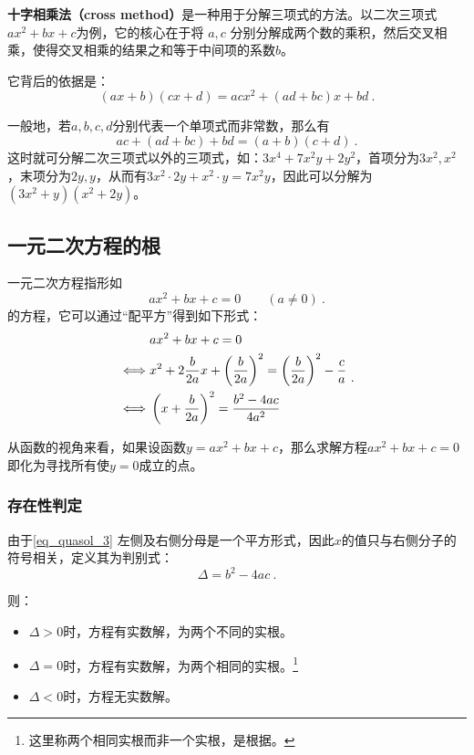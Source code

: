 \textbf{十字相乘法（cross method）}是一种用于分解三项式的方法。以二次三项式$ax^2 + bx + c$为例，它的核心在于将 $a,c$ 分别分解成两个数的乘积，然后交叉相乘，使得交叉相乘的结果之和等于中间项的系数$b$。

它背后的依据是：
\begin{equation}
(ax+b)(cx+d)=acx^2+(ad+bc)x+bd~.
\end{equation}

一般地，若$a,b,c,d$分别代表一个单项式而非常数，那么有
\begin{equation}
ac+(ad+bc)+bd=(a+b)(c+d)~.
\end{equation}
这时就可分解二次三项式以外的三项式，如：$3x^4+7x^2y+2y^2$，首项分为$3x^2,x^2$，末项分为$2y,y$，从而有$3x^2\cdot2y+x^2\cdot y=7x^2y$，因此可以分解为$(3x^2+y)(x^2+2y)$。

\subsection{一元二次方程的根}

一元二次方程指形如
\begin{equation}
ax^2+bx+c=0 \qquad (a\neq 0)~.
\end{equation}
的方程，它可以通过“配平方”得到如下形式：
\begin{equation}\label{eq_quasol_3}
\begin{split}
 & ax^2+bx+c = 0 \\ 
\iff&x^2+2{b\over 2a} x+\left({b\over 2a}\right)^2 = \left({b\over 2a}\right)^2-{c\over a} \\ 
\iff&\left(x+{b\over 2a}\right)^2 = {b^2-4ac\over 4a^2} \\ 
\end{split}~.
\end{equation}

从函数的视角来看，如果设函数$y=ax^2+bx+c$，那么求解方程$ax^2+bx+c=0$即化为寻找所有使$y=0$成立的点。

\subsubsection{存在性判定}

由于\autoref{eq_quasol_3} 左侧及右侧分母是一个平方形式，因此$x$的值只与右侧分子的符号相关，定义其为判别式：
\begin{equation}\label{eq_quasol_4}
\Delta = b^2-4ac~.
\end{equation}

则：
\begin{itemize}
\item $\Delta > 0$时，方程有实数解，为两个不同的实根。
\item $\Delta = 0$时，方程有实数解，为两个相同的实根。\footnote{这里称两个相同实根而非一个实根，是根据。}
\item $\Delta < 0$时，方程无实数解。
\end{itemize}

